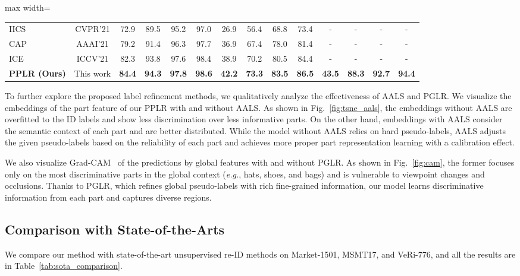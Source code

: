 \documentclass[10pt,twocolumn,letterpaper]{article}
\begin{document}
{\begin{table*}[!htbp]
\begin{adjustbox}{max width=\textwidth}
\begin{tabular}{l|c|cccc|cccc|cccc}
    		IICS~\cite{xuan2021intra} & CVPR'21 & 72.9 & 89.5 & 95.2 & 97.0 & 26.9 & 56.4 & {68.8} & {73.4} & - & - & - & -\\
    		CAP~\cite{wang2021camera} & AAAI'21 & 79.2 & 91.4 & 96.3 & 97.7 & {36.9} & {67.4} & {78.0} & {81.4} & - & - & - & -\\
    		ICE~\cite{chen2021ice} & ICCV'21
    		& {82.3} & {93.8} & {97.6} & {98.4}
    		& {38.9} & {70.2} & {80.5} & {84.4}
    		& - & - & - & -\\
    		\textbf{PPLR (Ours)} & This work 
    		& \textbf{84.4} & \textbf{94.3} & \textbf{97.8} & \textbf{98.6}
            & \textbf{42.2} & \textbf{73.3} & \textbf{83.5} & \textbf{86.5}
            & \textbf{43.5} & \textbf{88.3} & \textbf{92.7} & \textbf{94.4} \\
    	\hline	
    	\end{tabular}
    	\end{adjustbox}
    	\caption{Comparison with the state-of-the-art methods on Market1501, MSMT17, and VeRi-776.}
    	\vspace{-5mm}
    \label{tab:sota_comparison}
    \end{table*} 

    To further explore the proposed label refinement methods, we qualitatively analyze the effectiveness of AALS and PGLR.
    We visualize the embeddings of the part feature of our PPLR with and without AALS.
    As shown in Fig.~\ref{fig:tsne_aals}, the embeddings without AALS are overfitted to the ID labels and show less discrimination over less informative parts.
    On the other hand, embeddings with AALS consider the semantic context of each part and are better distributed.
    While the model without AALS relies on hard pseudo-labels, AALS adjusts the given pseudo-labels based on the reliability of each part and achieves more proper part representation learning with a calibration effect.

    We also visualize Grad-CAM~\cite{selvaraju2017grad} of the predictions by global features with and without PGLR.
    As shown in Fig.~\ref{fig:cam}, the former focuses only on the most discriminative parts in the global context (\textit{e.g.}, hats, shoes, and bags) and is vulnerable to viewpoint changes and occlusions.
    Thanks to PGLR, which refines global pseudo-labels with rich fine-grained information, our model learns discriminative information from each part and captures diverse regions.
}

\subsection{Comparison with State-of-the-Arts}
    We compare our method with state-of-the-art unsupervised re-ID methods on Market-1501, MSMT17, and VeRi-776, and all the results are in Table~\ref{tab:sota_comparison}.
\end{document}
